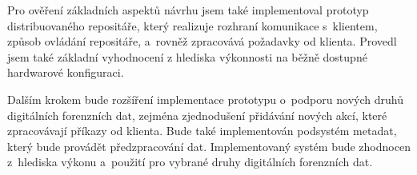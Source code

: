 Pro ověření základních aspektů návrhu jsem také implementoval prototyp distribuovaného repositáře, který realizuje rozhraní komunikace s~klientem, způsob ovládání repositáře, a~rovněž zpracovává požadavky od klienta. Provedl jsem také základní vyhodnocení z hlediska výkonnosti na běžně dostupné hardwarové konfiguraci.

Dalším krokem bude rozšíření implementace prototypu o~podporu nových druhů digitálních forenzních dat, zejména zjednodušení přidávání nových akcí, které zpracovávají příkazy od klienta. Bude také implementován podsystém metadat, který bude provádět předzpracování dat.
Implementovaný systém bude zhodnocen z~hlediska výkonu a~použití pro vybrané druhy digitálních forenzních dat.

